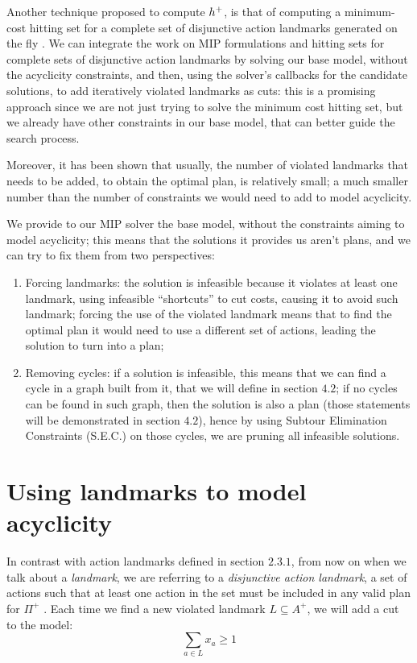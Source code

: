 Another technique proposed to compute $h^+$, is that of computing a minimum-cost hitting set for a complete set of disjunctive action landmarks generated on the fly \cite{Bonet_11, MLM_Haslum_12}. We can integrate the work on MIP formulations and hitting sets for complete sets of disjunctive action landmarks by solving our base model, without the acyclicity constraints, and then, using the solver's callbacks for the candidate solutions, to add iteratively violated landmarks as cuts: this is a promising approach since we are not just trying to solve the minimum cost hitting set, but we already have other constraints in our base model, that can better guide the search process.

Moreover, it has been shown \cite{MLM_Haslum_12} that usually, the number of violated landmarks that needs to be added, to obtain the optimal plan, is relatively small; a much smaller number than the number of constraints we would need to add to model acyclicity.

We provide to our MIP solver the base model, without the constraints aiming to model acyclicity; this means that the solutions it provides us aren't plans, and we can try to fix them from two perspectives:
\begin{enumerate}
    \item Forcing landmarks: the solution is infeasible because it violates at least one landmark, using infeasible ``shortcuts'' to cut costs, causing it to avoid such landmark; forcing the use of the violated landmark means that to find the optimal plan it would need to use a different set of actions, leading the solution to turn into a plan;
    \item Removing cycles: if a solution is infeasible, this means that we can find a cycle in a graph built from it, that we will define in section $4.2$; if no cycles can be found in such graph, then the solution is also a plan (those statements will be demonstrated in section $4.2$), hence by using Subtour Elimination Constraints (S.E.C.) on those cycles, we are pruning all infeasible solutions.
\end{enumerate}

\section{Using landmarks to model acyclicity}
In contrast with action landmarks defined in section $2.3.1$, from now on when we talk about a \textit{landmark}, we are referring to a \textit{disjunctive action landmark}, a set of actions such that at least one action in the set must be included in any valid plan for $\Pi^+$ \cite{Bonet_11, MLM_Haslum_12}. Each time we find a new violated landmark $L\subseteq A^+$, we will add a cut to the model:
$$\sum_{a\in L}x_a\geq 1$$

